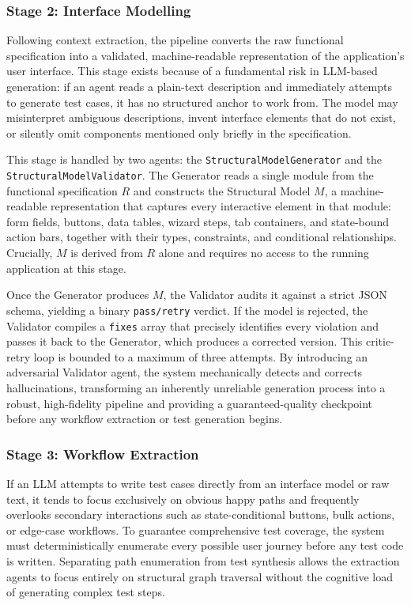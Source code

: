 \subsubsection{Stage 2: Interface Modelling}

Following context extraction, the pipeline converts the raw functional specification into a validated, machine-readable representation of the application's user interface. This stage exists because of a fundamental risk in LLM-based generation: if an agent reads a plain-text description and immediately attempts to generate test cases, it has no structured anchor to work from. The model may misinterpret ambiguous descriptions, invent interface elements that do not exist, or silently omit components mentioned only briefly in the specification.

This stage is handled by two agents: the \texttt{StructuralModelGenerator} and the \texttt{StructuralModelValidator}. The Generator reads a single module from the functional specification $R$ and constructs the Structural Model $M$, a machine-readable representation that captures every interactive element in that module: form fields, buttons, data tables, wizard steps, tab containers, and state-bound action bars, together with their types, constraints, and conditional relationships. Crucially, $M$ is derived from $R$ alone and requires no access to the running application at this stage.

Once the Generator produces $M$, the Validator audits it against a strict JSON schema, yielding a binary \texttt{pass/retry} verdict. If the model is rejected, the Validator compiles a \texttt{fixes} array that precisely identifies every violation and passes it back to the Generator, which produces a corrected version. This critic-retry loop is bounded to a maximum of three attempts. By introducing an adversarial Validator agent, the system mechanically detects and corrects hallucinations, transforming an inherently unreliable generation process into a robust, high-fidelity pipeline and providing a guaranteed-quality checkpoint before any workflow extraction or test generation begins.

\subsubsection{Stage 3: Workflow Extraction}

If an LLM attempts to write test cases directly from an interface model or raw text, it tends to focus exclusively on obvious happy paths and frequently overlooks secondary interactions such as state-conditional buttons, bulk actions, or edge-case workflows. To guarantee comprehensive test coverage, the system must deterministically enumerate every possible user journey before any test code is written. Separating path enumeration from test synthesis allows the extraction agents to focus entirely on structural graph traversal without the cognitive load of generating complex test steps.


